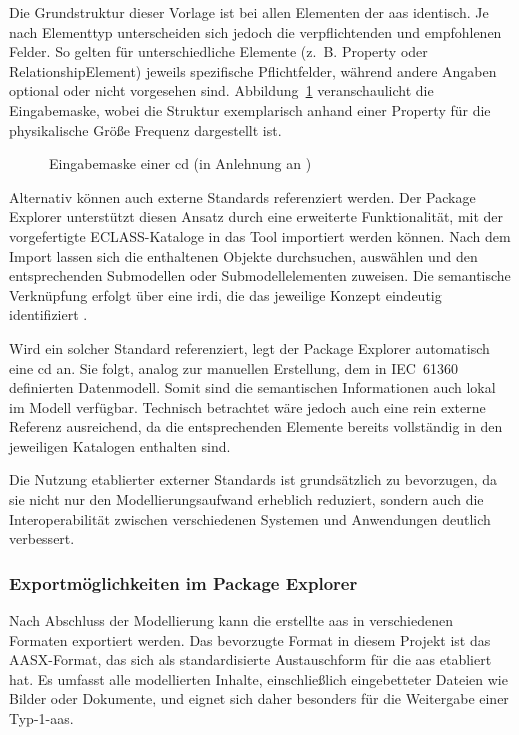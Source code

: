 Die Grundstruktur dieser Vorlage ist bei allen Elementen der \acs{aas} identisch.
Je nach Elementtyp unterscheiden sich jedoch die verpflichtenden und empfohlenen Felder.
So gelten für unterschiedliche Elemente (z.~B. Property oder RelationshipElement) jeweils spezifische Pflichtfelder, während andere Angaben optional oder nicht vorgesehen sind.
Abbildung~\ref{fig:SubmodellTypenschild} veranschaulicht die Eingabemaske, wobei die Struktur exemplarisch anhand einer Property für die physikalische Größe Frequenz dargestellt ist.

\begin{figure}[htbp]
    \centering
    
    \vspace{-0.5em}
    \caption[Eingabemaske einer \acs{cd}]{Eingabemaske einer \acs{cd} (in Anlehnung an \cite{SpezifikationPart3a})}
    \label{fig:SubmodellTypenschild}
\end{figure}
\vspace{-0.5em}

Alternativ können auch externe Standards referenziert werden. 
Der Package Explorer unterstützt diesen Ansatz durch eine erweiterte Funktionalität, mit der vorgefertigte ECLASS-Kataloge in das Tool importiert werden können. 
Nach dem Import lassen sich die enthaltenen Objekte durchsuchen, auswählen und den entsprechenden Submodellen oder Submodellelementen zuweisen. 
Die semantische Verknüpfung erfolgt über eine \acs{irdi}, die das jeweilige Konzept eindeutig identifiziert \cite{eclass_irdi}.

Wird ein solcher Standard referenziert, legt der Package Explorer automatisch eine \acs{cd} an. 
Sie folgt, analog zur manuellen Erstellung, dem in IEC~61360 definierten Datenmodell. 
Somit sind die semantischen Informationen auch lokal im Modell verfügbar.
Technisch betrachtet wäre jedoch auch eine rein externe Referenz ausreichend, da die entsprechenden Elemente bereits vollständig in den jeweiligen Katalogen enthalten sind.

Die Nutzung etablierter externer Standards ist grundsätzlich zu bevorzugen, da sie nicht nur den Modellierungsaufwand erheblich reduziert, sondern auch die Interoperabilität zwischen verschiedenen Systemen und Anwendungen deutlich verbessert.

\subsubsection*{Exportmöglichkeiten im Package Explorer}
Nach Abschluss der Modellierung kann die erstellte \acs{aas} in verschiedenen Formaten exportiert werden.
Das bevorzugte Format in diesem Projekt ist das AASX-Format, das sich als standardisierte Austauschform für die \acs{aas} etabliert hat.
Es umfasst alle modellierten Inhalte, einschließlich eingebetteter Dateien wie Bilder oder Dokumente, und eignet sich daher besonders für die Weitergabe einer Typ-1-\acs{aas}.

